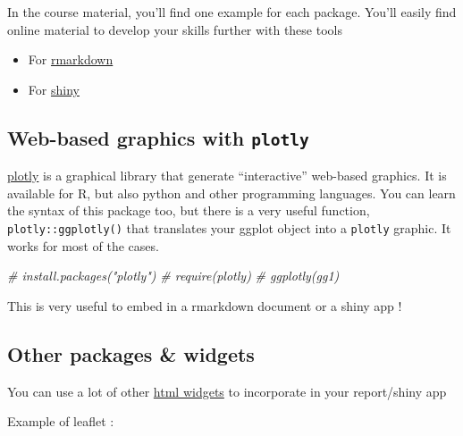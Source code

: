 \documentclass[
]{book}
\newenvironment{Shaded}{\begin{snugshade}}{\end{snugshade}}
\newcommand{\CommentTok}[1]{\textcolor[rgb]{0.56,0.35,0.01}{\textit{#1}}}
\providecommand{\tightlist}{%
  \setlength{\itemsep}{0pt}\setlength{\parskip}{0pt}}
\begin{document}
In the course material, you'll find one example for each package. You'll easily find online material to develop your skills further with these tools

\begin{itemize}
\tightlist
\item
  For \href{https://bookdown.org/yihui/rmarkdown/}{rmarkdown}
\item
  For \href{https://mastering-shiny.org/}{shiny}
\end{itemize}

\hypertarget{web-based-graphics-with-plotly}{%
\subsection{\texorpdfstring{Web-based graphics with \texttt{plotly}}{Web-based graphics with plotly}}\label{web-based-graphics-with-plotly}}

\href{https://plotly.com/r/}{plotly} is a graphical library that generate ``interactive'' web-based graphics. It is available for R, but also python and other programming languages. You can learn the syntax of this package too, but there is a very useful function, \texttt{plotly::ggplotly()} that translates your ggplot object into a \texttt{plotly} graphic. It works for most of the cases.

\begin{Shaded}
\begin{Highlighting}[]
\CommentTok{# install.packages("plotly")}
\CommentTok{# require(plotly)}
\CommentTok{# ggplotly(gg1)}
\end{Highlighting}
\end{Shaded}

This is very useful to embed in a rmarkdown document or a shiny app !

\hypertarget{other-packages-widgets}{%
\subsection{Other packages \& widgets}\label{other-packages-widgets}}

You can use a lot of other \href{https://www.htmlwidgets.org/index.html}{html widgets} to incorporate in your report/shiny app

Example of leaflet :

\begin{Shaded}
\end{Shaded}
\end{document}
